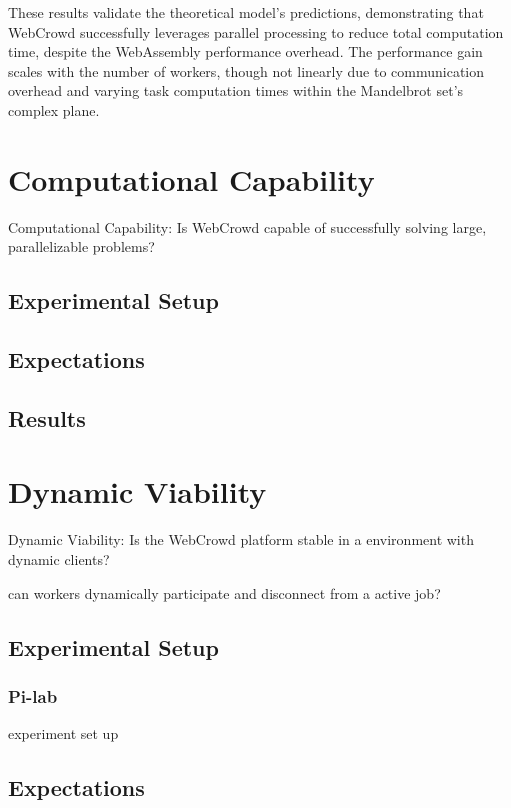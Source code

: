 These results validate the theoretical model's predictions, demonstrating that WebCrowd successfully leverages parallel processing to reduce total computation time, despite the WebAssembly performance overhead. The performance gain scales with the number of workers, though not linearly due to communication overhead and varying task computation times within the Mandelbrot set's complex plane.

\section{Computational Capability}
\label{sec:evaluation:computation}
Computational Capability: Is WebCrowd capable of successfully solving large, parallelizable problems?

\subsection{Experimental Setup}

\subsection{Expectations}

\subsection{Results}

\section{Dynamic Viability}
\label{sec:evaluation:dynamic}
Dynamic Viability: Is the WebCrowd platform stable in a environment with dynamic clients?


can workers dynamically participate and disconnect from a active job?

\subsection{Experimental Setup}

\subsubsection{Pi-lab}
experiment set up

\subsection{Expectations}


